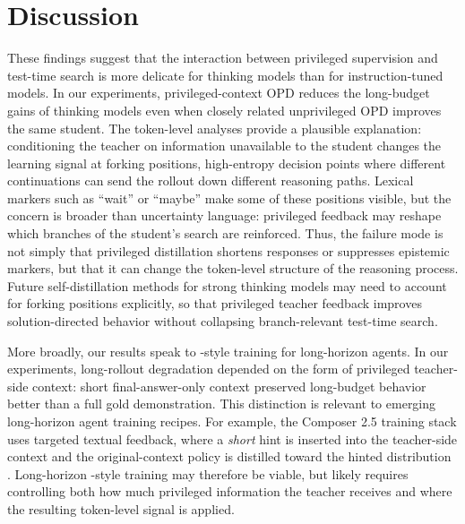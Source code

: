 \section{Discussion}
\label{sec:Discussion}

These findings suggest that the interaction between privileged supervision and
test-time search is more delicate for thinking models than for instruction-tuned
models. In our experiments, privileged-context OPD reduces the long-budget gains
of thinking models even when closely related unprivileged OPD improves the same
student. The token-level analyses provide a plausible explanation: conditioning
the teacher on information unavailable to the student changes the learning
signal at forking positions, high-entropy decision points where different
continuations can send the rollout down different reasoning paths. Lexical
markers such as ``wait'' or ``maybe'' make some of these positions visible, but
the concern is broader than uncertainty language: privileged feedback may
reshape which branches of the student's search are reinforced. Thus, the
failure mode is not simply that privileged distillation shortens responses or
suppresses epistemic markers, but that it can change the token-level structure
of the reasoning process. Future self-distillation methods for strong
thinking models may need to account for forking positions explicitly, so that
privileged teacher feedback improves solution-directed behavior without
collapsing branch-relevant test-time search.

More broadly, our results speak to \opsd{}-style training for long-horizon
agents. In our experiments, long-rollout degradation depended on the form of
privileged teacher-side context: short final-answer-only context preserved
long-budget behavior better than a full gold demonstration. This distinction is
relevant to emerging long-horizon agent training recipes. For example, the
Composer 2.5 training stack uses targeted textual feedback, where a \emph{short}
hint is inserted into the teacher-side context and the original-context policy is
distilled toward the hinted distribution \citep{cursor2026composer25}.
Long-horizon \opsd{}-style training may therefore be viable, but likely requires
controlling both how much privileged information the teacher receives and where
the resulting token-level signal is applied.
